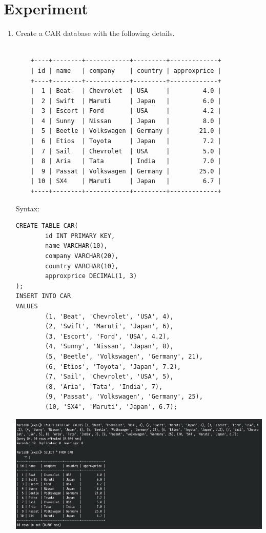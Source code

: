 \documentclass[13pt,oneside]{book}
\begin{document}
\section*{Experiment}
	\begin{enumerate}
\item
Create a CAR database with the following details.
\begin{verbatim}

	+----+--------+------------+---------+-------------+
	| id | name   | company    | country | approxprice |
	+----+--------+------------+---------+-------------+
	|  1 | Beat   | Chevrolet  | USA     |         4.0 |
	|  2 | Swift  | Maruti     | Japan   |         6.0 |
	|  3 | Escort | Ford       | USA     |         4.2 |
	|  4 | Sunny  | Nissan     | Japan   |         8.0 |
	|  5 | Beetle | Volkswagen | Germany |        21.0 |
	|  6 | Etios  | Toyota     | Japan   |         7.2 |
	|  7 | Sail   | Chevrolet  | USA     |         5.0 |
	|  8 | Aria   | Tata       | India   |         7.0 |
	|  9 | Passat | Volkswagen | Germany |        25.0 |
	| 10 | SX4    | Maruti     | Japan   |         6.7 |
	+----+--------+------------+---------+-------------+
\end{verbatim}
 
Syntax:
\begin{verbatim}
CREATE TABLE CAR(
        id INT PRIMARY KEY,
        name VARCHAR(10),
        company VARCHAR(20),
        country VARCHAR(10),
        approxprice DECIMAL(1, 3)
);
INSERT INTO CAR 
VALUES
        (1, 'Beat', 'Chevrolet', 'USA', 4),
        (2, 'Swift', 'Maruti', 'Japan', 6),
        (3, 'Escort', 'Ford', 'USA', 4.2),
        (4, 'Sunny', 'Nissan', 'Japan', 8),
        (5, 'Beetle', 'Volkswagen', 'Germany', 21),
        (6, 'Etios', 'Toyota', 'Japan', 7.2),
        (7, 'Sail', 'Chevrolet', 'USA', 5),
        (8, 'Aria', 'Tata', 'India', 7),
        (9, 'Passat', 'Volkswagen', 'Germany', 25),
        (10, 'SX4', 'Maruti', 'Japan', 6.7);

\end{verbatim}
\includegraphics[]{img/p3/ss1.png}



\end{enumerate}
\end{document}
